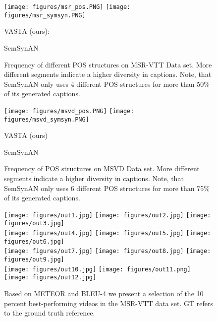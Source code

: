 \documentclass[runningheads,table]{llncs}
\newcommand{\modelName}{VASTA\xspace}
\begin{document}
\begin{figure*}
    \centering
    {
    \hfill \texttt{[image: figures/msr\_pos.PNG]} \hfill
    \hfill  \texttt{[image: figures/msr\_symsyn.PNG]} \hfill
    \\
    \parbox{0.55\linewidth}{\centering
    \small{\modelName{} (ours): }
    }
    \parbox{0.40\linewidth}{\centering
    \small{SemSynAN~\cite{perez2021improving}}
    }
    }
 
      
    \caption{Frequency of different POS structures on MSR-VTT Data set. More different segments indicate a higher diversity in captions. Note, that SemSynAN only uses 4 different POS structures for more than 50\% of its generated captions.}\label{fig:pos_msr}
\end{figure*}
\begin{figure*}
    {
        \hfill \texttt{[image: figures/msvd\_pos.PNG]} \hfill
        \hfill \texttt{[image: figures/msvd\_symsyn.PNG]} \hfill
        \\
        \parbox{0.60\linewidth}{\centering
        \small{\modelName{} (ours)}
        }
        \parbox{0.40\linewidth}{\centering
        \small{SemSynAN~\cite{perez2021improving}}
        }
    }
      
    \caption{Frequency of POS structures on MSVD Data set. More different segments indicate a higher diversity in captions. Note, that SemSynAN only uses 6 different POS structures for more than 75\% of its generated captions. }\label{fig:pos_msvd}
\end{figure*}

\begin{figure*}

    \texttt{[image: figures/out1.jpg]}
    \texttt{[image: figures/out2.jpg]}
    \texttt{[image: figures/out3.jpg]}
    \\
    \texttt{[image: figures/out4.jpg]}
    \texttt{[image: figures/out5.jpg]}
    \texttt{[image: figures/out6.jpg]}
    \\
    \texttt{[image: figures/out7.jpg]}
    \texttt{[image: figures/out8.jpg]}
    \texttt{[image: figures/out9.jpg]}
    \\
    \texttt{[image: figures/out10.jpg]}
    \texttt{[image: figures/out11.png]}
    \texttt{[image: figures/out12.jpg]}
    \\
      
    \caption{Based on METEOR and BLEU-4 we present a selection of the 10 percent best-performing videos in the  MSR-VTT data set. GT refers to the ground truth reference.}\label{fig:best-out}
\end{figure*}
\end{document}
